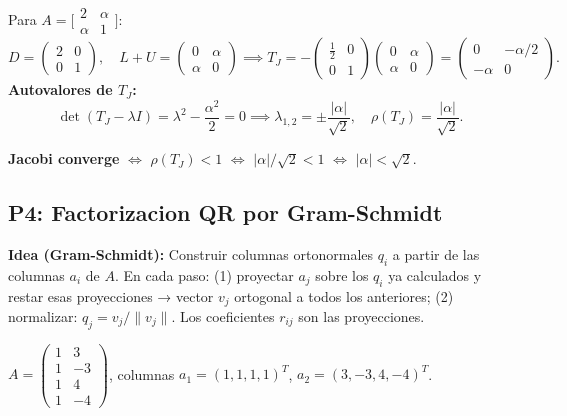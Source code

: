 \documentclass[11pt,a4paper]{article}
\begin{document}
Para $A = \bigl[\begin{smallmatrix}2&\alpha\\\alpha&1\end{smallmatrix}\bigr]$:
\[
  D = \begin{pmatrix}2&0\\0&1\end{pmatrix},\quad L+U = \begin{pmatrix}0&\alpha\\\alpha&0\end{pmatrix}
  \implies
  T_J = -\begin{pmatrix}\tfrac{1}{2}&0\\0&1\end{pmatrix}\begin{pmatrix}0&\alpha\\\alpha&0\end{pmatrix}
  = \begin{pmatrix}0 & -\alpha/2\\-\alpha & 0\end{pmatrix}.
\]
\textbf{Autovalores de $T_J$:}
\[
  \det(T_J - \lambda I) = \lambda^2 - \frac{\alpha^2}{2} = 0
  \implies \lambda_{1,2} = \pm\frac{|\alpha|}{\sqrt{2}},
  \quad \rho(T_J) = \frac{|\alpha|}{\sqrt{2}}.
\]

\begin{tcolorbox}[clave]
\textbf{Jacobi converge} $\Leftrightarrow$ $\rho(T_J)<1$ $\Leftrightarrow$ $|\alpha|/\sqrt{2}<1$
$\Leftrightarrow$ $|\alpha| < \sqrt{2}$.
\end{tcolorbox}

\subsection{P4: Factorizacion QR por Gram-Schmidt}
\label{sec:pt2_2016_p4}

\textbf{Idea (Gram-Schmidt):} Construir columnas ortonormales $q_i$ a partir de las columnas $a_i$ de $A$. En cada paso: (1) proyectar $a_j$ sobre los $q_i$ ya calculados y restar esas proyecciones → vector $v_j$ ortogonal a todos los anteriores; (2) normalizar: $q_j = v_j/\|v_j\|$. Los coeficientes $r_{ij}$ son las proyecciones.

$A = \begin{pmatrix}1&3\\1&-3\\1&4\\1&-4\end{pmatrix}$, columnas $a_1=(1,1,1,1)^T$, $a_2=(3,-3,4,-4)^T$.
\end{document}
